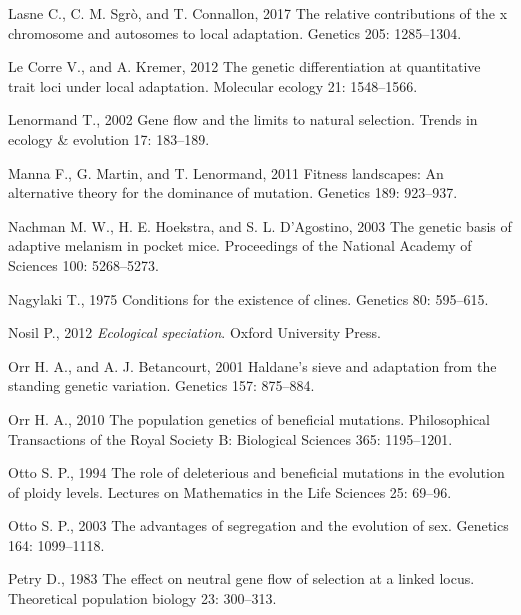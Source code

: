 \documentclass[
  11pt,
]{article}
\newlength{\cslhangindent}
\newlength{\cslentryspacingunit} %
\newenvironment{CSLReferences}[2] %
 {%
  \setlength{\parindent}{0pt}
  \ifodd #1
  \let\oldpar\par
  \def\par{\hangindent=\cslhangindent\oldpar}
  \fi
  \setlength{\parskip}{#2\cslentryspacingunit}
 }%
 {}
\begin{document}
\begin{CSLReferences}{1}{0}
\leavevmode{}%
Lasne C., C. M. Sgrò, and T. Connallon, 2017 The relative contributions
of the x chromosome and autosomes to local adaptation. Genetics 205:
1285--1304.

\leavevmode{}%
Le Corre V., and A. Kremer, 2012 The genetic differentiation at
quantitative trait loci under local adaptation. Molecular ecology 21:
1548--1566.

\leavevmode{}%
Lenormand T., 2002 Gene flow and the limits to natural selection. Trends
in ecology \& evolution 17: 183--189.

\leavevmode{}%
Manna F., G. Martin, and T. Lenormand, 2011 Fitness landscapes: An
alternative theory for the dominance of mutation. Genetics 189:
923--937.

\leavevmode{}%
Nachman M. W., H. E. Hoekstra, and S. L. D'Agostino, 2003 The genetic
basis of adaptive melanism in pocket mice. Proceedings of the National
Academy of Sciences 100: 5268--5273.

\leavevmode{}%
Nagylaki T., 1975 Conditions for the existence of clines. Genetics 80:
595--615.

\leavevmode{}%
Nosil P., 2012 \emph{Ecological speciation}. Oxford University Press.

\leavevmode{}%
Orr H. A., and A. J. Betancourt, 2001 Haldane's sieve and adaptation
from the standing genetic variation. Genetics 157: 875--884.

\leavevmode{}%
Orr H. A., 2010 The population genetics of beneficial mutations.
Philosophical Transactions of the Royal Society B: Biological Sciences
365: 1195--1201.

\leavevmode{}%
Otto S. P., 1994 The role of deleterious and beneficial mutations in the
evolution of ploidy levels. Lectures on Mathematics in the Life Sciences
25: 69--96.

\leavevmode{}%
Otto S. P., 2003 The advantages of segregation and the evolution of sex.
Genetics 164: 1099--1118.

\leavevmode{}%
Petry D., 1983 The effect on neutral gene flow of selection at a linked
locus. Theoretical population biology 23: 300--313.


\end{CSLReferences}
\end{document}
